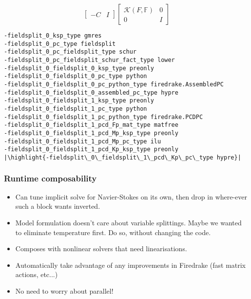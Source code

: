 \documentclass[presentation]{beamer}
\newcommand{\KSP}[2]{\ensuremath{\mathcal{K}\left(#1, \mathbb{#2}\right)}}
\newcommand{\ksp}[1]{\KSP{#1}{#1}}
\newcommand{\highlight}[1]{\colorbox{red!20}{\color{black} #1}}
\begin{document}
\begin{frame}[fragile]
\begin{onlyenv}
\begin{equation*}
{\begin{bmatrix}
        -C & I
      \end{bmatrix}
      \begin{bmatrix}
        \ksp{F} & 0 \\
        0 & I
      \end{bmatrix}}
    \end{equation*}
\begin{verbatim}
-fieldsplit_0_ksp_type gmres
-fieldsplit_0_pc_type fieldsplit
-fieldsplit_0_pc_fieldsplit_type schur
-fieldsplit_0_pc_fieldsplit_schur_fact_type lower
-fieldsplit_0_fieldsplit_0_ksp_type preonly
-fieldsplit_0_fieldsplit_0_pc_type python
-fieldsplit_0_fieldsplit_0_pc_python_type firedrake.AssembledPC
-fieldsplit_0_fieldsplit_0_assembled_pc_type hypre
-fieldsplit_0_fieldsplit_1_ksp_type preonly
-fieldsplit_0_fieldsplit_1_pc_type python
-fieldsplit_0_fieldsplit_1_pc_python_type firedrake.PCDPC
-fieldsplit_0_fieldsplit_1_pcd_Fp_mat_type matfree
-fieldsplit_0_fieldsplit_1_pcd_Mp_ksp_type preonly
-fieldsplit_0_fieldsplit_1_pcd_Mp_pc_type ilu
-fieldsplit_0_fieldsplit_1_pcd_Kp_ksp_type preonly
|\highlight{-fieldsplit\_0\_fieldsplit\_1\_pcd\_Kp\_pc\_type hypre}|
\end{verbatim}
  \end{onlyenv}
\end{frame}

\begin{frame}
  \frametitle{Runtime composability}

  \begin{itemize}
  \item Can tune implicit solve for Navier-Stokes on its own, then
    drop in where-ever such a block wants inverted.

  \item Model formulation doesn't care about variable
    splittings. Maybe we wanted to eliminate temperature first.  Do
    so, without changing the code.

  \item Composes with nonlinear solvers that need linearisations.

  \item Automatically take advantage of any improvements in Firedrake
    (fast matrix actions, etc...)

  \item No need to worry about parallel!
  \end{itemize}
\end{frame}
\end{document}
